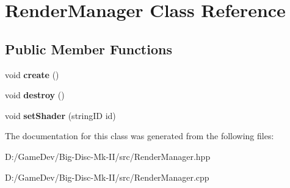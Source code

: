 \hypertarget{class_render_manager}{}\section{Render\+Manager Class Reference}
\label{class_render_manager}
\subsection*{Public Member Functions}
\begin{DoxyCompactItemize}
\item 
\mbox{\label{class_render_manager_a967ff4cd34cc9bafa0c50cbbf2a12d38}} 
void {\bfseries create} ()
\item 
\mbox{\label{class_render_manager_aed2fef86a5104dafaaeea74aa77ce135}} 
void {\bfseries destroy} ()
\item 
\mbox{\label{class_render_manager_a86a1b0a75149fca80945c8a80db6ce6e}} 
void {\bfseries set\+Shader} (string\+ID id)
\end{DoxyCompactItemize}


The documentation for this class was generated from the following files\+:\begin{DoxyCompactItemize}
\item 
D\+:/\+Game\+Dev/\+Big-\/\+Disc-\/\+Mk-\/\+I\+I/src/Render\+Manager.\+hpp\item 
D\+:/\+Game\+Dev/\+Big-\/\+Disc-\/\+Mk-\/\+I\+I/src/Render\+Manager.\+cpp\end{DoxyCompactItemize}
